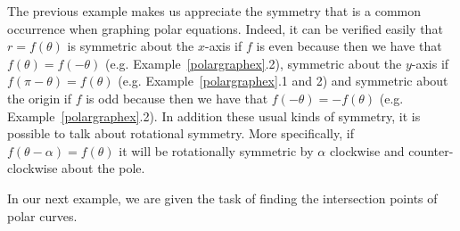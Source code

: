 The previous example makes us appreciate the symmetry that is a common occurrence when graphing polar equations.  Indeed, it can be verified easily that $r=f(\theta)$ is symmetric about the $x$-axis if $f$ is even because then we have that $f(\theta)=f(-\theta)$ (e.g. Example~\ref{polargraphex}.2), symmetric about the $y$-axis if $f(\pi-\theta)=f(\theta)$ (e.g. Example~\ref{polargraphex}.1 and 2) and symmetric about the origin if $f$ is odd because then we have that $f(-\theta)=-f(\theta)$ (e.g. Example~\ref{polargraphex}.2).  In addition these usual kinds of symmetry, it is possible to talk about rotational symmetry. More specifically, if $f(\theta - \alpha) = f(\theta)$ it will be rotationally symmetric by $\alpha$ clockwise and counter-clockwise about the pole. 


 
 

 In our next example, we are given the task of finding the intersection points of polar curves.


